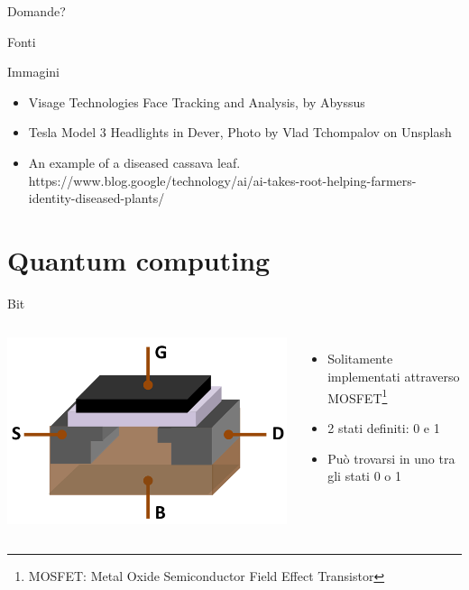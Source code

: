 \documentclass{beamer}
\begin{document}
    \begin{frame}[focus]
        Domande?
    \end{frame}

    \appendix

    \begin{frame}{Fonti}
        
        
    \end{frame}

    \begin{frame}{Immagini}
        \begin{itemize}
            \item Visage Technologies Face Tracking and Analysis, by Abyssus
            \item Tesla Model 3 Headlights in Dever, Photo by Vlad Tchompalov on Unsplash
            \item An example of a diseased cassava leaf. https://www.blog.google/technology/ai/ai-takes-root-helping-farmers-identity-diseased-plants/
        \end{itemize}
    \end{frame}

    \section{Quantum computing}

    \begin{frame}{Bit}
        \begin{columns}
            \includegraphics[width=\textwidth]{gfx/MOSFET_Structure.png}
            \begin{itemize}
                \item Solitamente implementati attraverso MOSFET\footnote{MOSFET: Metal Oxide Semiconductor Field Effect Transistor}
                \item 2 stati definiti: 0 e 1
                \item Può trovarsi in uno tra gli stati 0 o 1
            \end{itemize}
        \end{columns}
    \end{frame}
\end{document}
